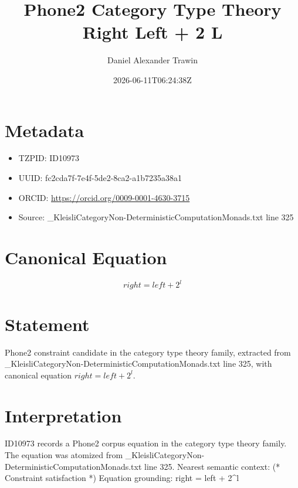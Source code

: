 \documentclass[11pt]{article}
\title{Phone2 Category Type Theory Right Left + 2 L}
\author{Daniel Alexander Trawin}
\date{2026-06-11T06:24:38Z}
\begin{document}
\maketitle
\section*{Metadata}
\begin{itemize}
\item TZPID: ID10973
\item UUID: fc2cda7f-7e4f-5de2-8ca2-a1b7235a38a1
\item ORCID: \url{https://orcid.org/0009-0001-4630-3715}
\item Source: _KleisliCategoryNon-DeterministicComputationMonads.txt line 325
\end{itemize}
\section*{Canonical Equation}
\[
right = left + 2^l
\]
\section*{Statement}
Phone2 constraint candidate in the category type theory family, extracted from _KleisliCategoryNon-DeterministicComputationMonads.txt line 325, with canonical equation $right = left + 2^l$.
\section*{Interpretation}
ID10973 records a Phone2 corpus equation in the category type theory family. The equation was atomized from _KleisliCategoryNon-DeterministicComputationMonads.txt line 325. Nearest semantic context: (* Constraint satisfaction *) Equation grounding: right = left + 2^l
\end{document}
